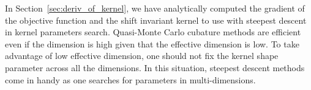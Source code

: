 \documentclass{iitthesis}          %
\newcommand\secref{Section~\ref}
\begin{document}
{{{{{{%
In \secref{sec:deriv_of_kernel}, we have analytically computed the gradient of the objective function and the shift invariant kernel to use with steepest descent in kernel parameters search. 
Quasi-Monte Carlo cubature methods are efficient \cite{SloWoz98} even if the dimension is high given that the effective dimension is low.
To take advantage of low effective dimension, one should not fix the kernel shape parameter across all the dimensions. In this situation, steepest descent methods come in handy as one searches for parameters in multi-dimensions. 

% 

}}}}}}
\end{document}

